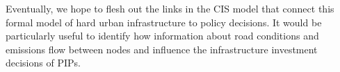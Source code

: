 \documentclass[
]{article}
\begin{document}
Eventually, we hope to flesh out the links in the CIS model that connect
this formal model of hard urban infrastructure to policy decisions. It
would be particularly useful to identify how information about road
conditions and emissions flow between nodes and influence the
infrastructure investment decisions of PIPs.
\end{document}
